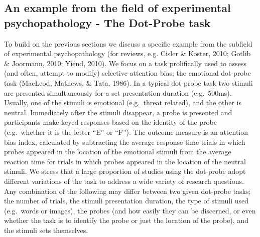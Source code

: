 \documentclass[english,,man,floatsintext]{apa6}
\begin{document}
\hypertarget{an-example-from-the-field-of-experimental-psychopathology---the-dot-probe-task}{%
\subsection{An example from the field of experimental psychopathology - The Dot-Probe task}\label{an-example-from-the-field-of-experimental-psychopathology---the-dot-probe-task}}

To build on the previous sections we discuss a specific example from the subfield of experimental psychopathology (for reviews, e.g. Cisler \& Koster, 2010; Gotlib \& Joormann, 2010; Yiend, 2010). We focus on a task prolifically used to assess (and often, attempt to modify) selective attention bias; the emotional dot-probe task (MacLeod, Mathews, \& Tata, 1986). In a typical dot-probe task two stimuli are presented simultaneously for a set presentation duration (e.g.~500ms). Usually, one of the stimuli is emotional (e.g.~threat related), and the other is neutral. Immediately after the stimuli disappear, a probe is presented and participants make keyed responses based on the identity of the probe (e.g.~whether it is the letter \enquote{E} or \enquote{F}). The outcome measure is an attention bias index, calculated by subtracting the average response time trials in which probes appeared in the location of the emotional stimuli from the average reaction time for trials in which probes appeared in the location of the neutral stimuli. We stress that a large proportion of studies using the dot-probe adopt different variations of the task to address a wide variety of research questions. Any combination of the following may differ between two given dot-probe tasks; the number of trials, the stimuli presentation duration, the type of stimuli used (e.g.~words or images), the probes (and how easily they can be discerned, or even whether the task is to identify the probe or just the location of the probe), and the stimuli sets themselves.
\end{document}
